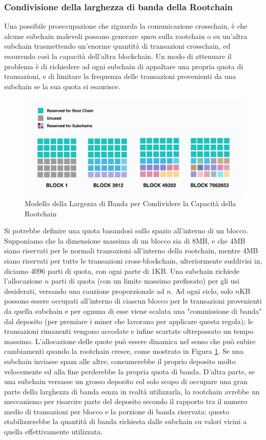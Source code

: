 \subsubsection{Condivisione della larghezza di banda della Rootchain}
Una possibile proeccupazione che riguarda la comunicazione crosschain, è che alcune subchain malevoli possano generare \emph{spam} sulla rootchain o su un'altra subchain trasmettendo un'enorme quantità di transazioni crosschain, ed esaurendo così la capacità dell'altra blockchain. Un modo di attenuare il problema è di richiedere ad ogni subchain di appaltare una propria quota di transazioni, e di limitare la frequenza delle transazioni provenienti da una subchain se la sua quota si esaurisce.

\begin{figure}[ht]
	\includegraphics[width=\textwidth]{Figura3.png}
	\caption{Modello della Largezza di Banda per Condividere la Capacità della Rootchain}
	\label{fig:fig3}
\end{figure}

Si potrebbe definire una quota basandosi sullo spazio all'interno di un blocco. Supponiamo che la dimensione massima di un blocco sia di 8MB, e che 4MB siano riservati per le normali transazioni all'interno della rootchain, mentre 4MB siano riservati per tutte le transazioni cross-blockchain, ulteriormente suddivisi in, diciamo 4096 parti di quota, con ogni parte di 1KB. Una subchain richiede l'allocazione $n$ parti di quota (con un limite massimo prefissato) per gli usi desiderati, versando una cauzione proporzionale ad $n$. Ad ogni ciclo, solo $n$KB possono essere occupati all'interno di ciascun blocco per le transazioni provenienti da quella subchain e per ognuna di esse viene scalata una "commissione di banda" dal deposito (per premiare i miner che lavorano per applicare questa regola); le transazioni rimanenti vengono accodate e infine scartate oltrepassato un tempo massimo. L'allocazione delle quote può essere dinamica nel senso che può subire cambiamenti quando la rootchain cresce, come mostrato in Figura \ref{fig:fig3}. Se una subchain inviasse spam alle altre, consumerebbe il proprio deposito molto velocemente ed alla fine perderebbe la propria quota di banda. D'altra parte, se una subchain versasse un grosso deposito col solo scopo di occupare una gran parte della larghezza di banda senza in realtà utilizzarla, la rootchain avrebbe un meccanismo per risarcire parte del deposito secondo il rapporto tra il numero medio di transazioni per blocco e la porzione di banda riservata: questo stabilizzerebbe la quantità di banda richiesta dalle subchain su valori vicini a quella effettivamente utilizzata.